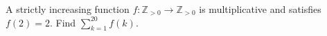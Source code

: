 A strictly increasing function $f:\mathbb Z_{>0}\to\mathbb Z_{>0}$ is multiplicative and satisfies $f(2)=2$. Find $\sum_{k=1}^{20}f(k)$.
